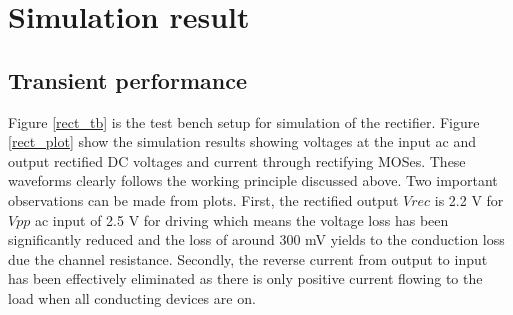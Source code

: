 \documentclass[12pt,a4paper,UKenglish]{report}
\begin{document}
\section{Simulation result}		%

\subsection{Transient performance}	%

Figure \ref{rect_tb} is the test bench setup for simulation of the rectifier. Figure \ref{rect_plot} show the simulation results showing voltages at the input ac and output rectified DC 
voltages and current through rectifying MOSes. These  
waveforms clearly follows the working principle discussed above. Two important observations can be made from 
plots. First, the rectified output $Vrec$ is 2.2 V for $Vpp$ ac input of 2.5 V for driving which means the 
voltage loss has been significantly reduced and the loss of around 300 mV yields to the conduction loss due 
the channel resistance. Secondly, the reverse current from output to input has been effectively eliminated as 
there is only positive current flowing to the load when all conducting devices 
are on.  \\
\end{document}
